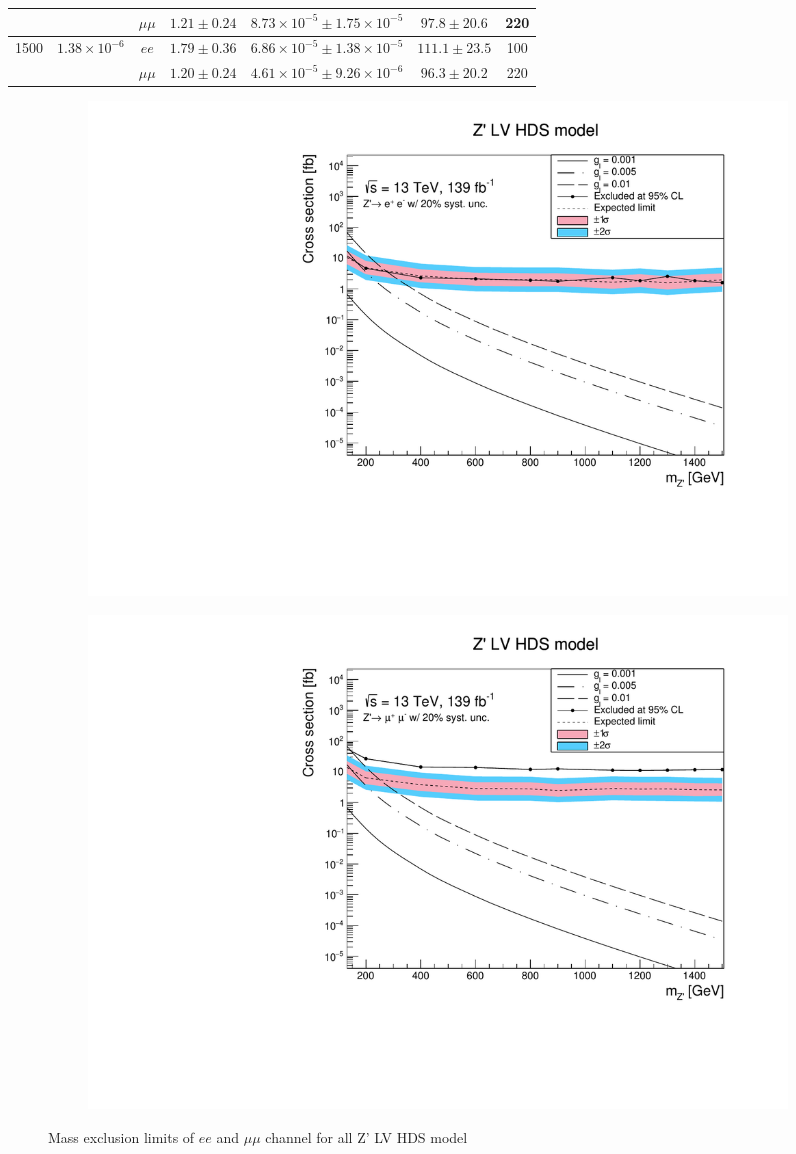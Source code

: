 \documentclass[12pt, a4paper]{book}
\begin{document}
\begin{table}[!ht]
\begin{tabular}{@{}ccc|cccc@{}}
         & & $\mu\mu$ & $1.21\pm0.24$ & $8.73\times10^{-5}\pm1.75\times10^{-5}$ & $97.8\pm20.6$ & 220\\ \midrule
         \multirow{2}{*}[-2\baselineskip]{1500}& \multirow{2}{*}[-2\baselineskip]{$1.38\times10^{-6}$}& $ee$ & $1.79\pm0.36$ & $6.86\times10^{-5}\pm1.38\times10^{-5}$ & $111.1\pm23.5$ & 100\\ 
         & & $\mu\mu$ & $1.20\pm0.24$ & $4.61\times10^{-5}\pm9.26\times10^{-6}$ & $96.3\pm20.2$ & 220\\ 
      \midrule\midrule
   \end{tabular}
   \label{tab:stat_vals_LV_HDS}
\end{table} 
\begin{figure}[!ht]
	\centering
   \begin{subfigure}[b]{0.49\textwidth}
      \centering
      \includegraphics[width=1\textwidth]{Limits/LV_HDS/mass_exclusion_ee.pdf}
      \end{subfigure}
   \hfill
   \begin{subfigure}[b]{0.49\textwidth}
      \centering
      \includegraphics[width=1\textwidth]{Limits/LV_HDS/mass_exclusion_uu.pdf}
      \end{subfigure}
   \caption{Mass exclusion limits of $ee$ and $\mu\mu$ channel for all Z' LV HDS model}\label{fig:LV_HDS_exclusion_ee_uu}
\end{figure}
\end{document}
